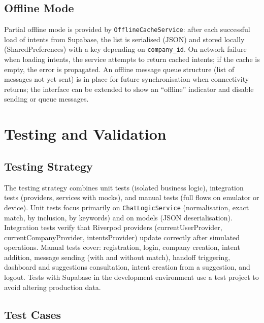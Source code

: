 \documentclass[12pt,a4paper]{report}
\begin{document}
\section{Offline Mode}

Partial offline mode is provided by \texttt{OfflineCacheService}: after each successful load of intents from Supabase, the list is serialised (JSON) and stored locally (SharedPreferences) with a key depending on \texttt{company\_id}. On network failure when loading intents, the service attempts to return cached intents; if the cache is empty, the error is propagated. An offline message queue structure (list of messages not yet sent) is in place for future synchronisation when connectivity returns; the interface can be extended to show an ``offline'' indicator and disable sending or queue messages.

\chapter{Testing and Validation}

\section{Testing Strategy}

The testing strategy combines unit tests (isolated business logic), integration tests (providers, services with mocks), and manual tests (full flows on emulator or device). Unit tests focus primarily on \texttt{ChatLogicService} (normalisation, exact match, by inclusion, by keywords) and on models (JSON deserialisation). Integration tests verify that Riverpod providers (currentUserProvider, currentCompanyProvider, intentsProvider) update correctly after simulated operations. Manual tests cover: registration, login, company creation, intent addition, message sending (with and without match), handoff triggering, dashboard and suggestions consultation, intent creation from a suggestion, and logout. Tests with Supabase in the development environment use a test project to avoid altering production data.

\section{Test Cases}
\end{document}
